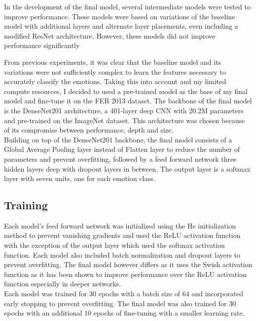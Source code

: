 \documentclass[12pt letter]{report}
\begin{document}

In the development of the final model, several intermediate models were tested to improve performance. These models
were based on variations of the baseline model with additional layers and alternate layer placements, even including a
modified ResNet architecture. However, these models did not improve performance significantly


From previous experiments, it was clear that the baseline model and its variations were not sufficiently complex to
learn the features necessary to accurately classify the emotions. Taking this into account and my limited compute
resources, I decided to used a pre-trained model as the base of my final model and fine-tune it on the FER 2013 dataset.
The backbone of the final model is the DenseNet201 architecture, a 401-layer deep CNN with 20.2M parameters and
pre-trained on the ImageNet dataset. This architecture was chosen because of its compromise between performance, depth
and size. \\

Building on top of the DenseNet201 backbone, the final model consists of a Global Average Pooling layer instead of
Flatten layer to reduce the number of parameters and prevent overfitting, followed by a feed forward network three
hidden layers deep with dropout layers in between. The output layer is a softmax layer with seven units, one for each
emotion class. \\

\subsection*{Training}
Each model's feed forward network was initialized using the He initialization method to prevent vanishing gradients and
used the ReLU activation function with the exception of the output layer which used the softmax activation function.
Each model also included batch normalization and dropout layers to prevent overfitting. The final model however differs
as it uses the Swish activation function as it has been shown to improve performance over the ReLU activation function
especially in deeper networks.\\

Each model was trained for 30 epochs with a batch size of 64 and incorporated early stopping to prevent overfitting. The
final model was also trained for 30 epochs with an additional 10 epochs of fine-tuning with a smaller learning rate. \\
\end{document}
